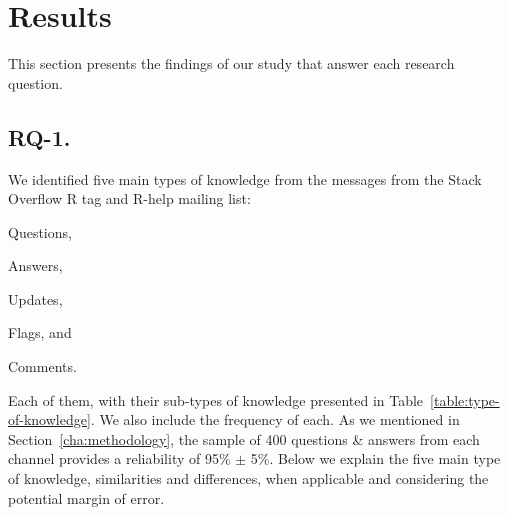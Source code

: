 \section{Results}
\label{cha:findings}

This section presents the findings of our study that answer each research question.

\subsection{RQ-1. \rqa}
\label{cha:findings-types}


We identified five main types of knowledge from the messages from the Stack Overflow R tag and R-help mailing list:
\begin{enumerate*}[label=(\arabic*)]
\item Questions,
\item Answers,
\item Updates,
\item Flags, and
\item Comments.
\end{enumerate*}
    Each of them, with their sub-types of knowledge presented in Table~\ref{table:type-of-knowledge}. We also include the frequency of each. As we mentioned in Section~\ref{cha:methodology}, the sample of 400 questions \& answers from each channel provides a reliability of 95\% $\pm$ 5\%.
    Below we explain the five main type of knowledge, similarities and differences, when applicable and considering the potential margin of error.

